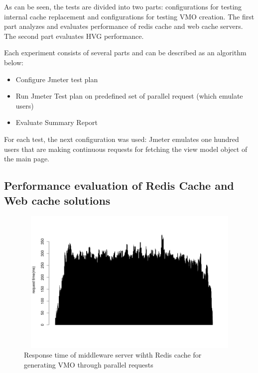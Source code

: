 As can be seen, the tests are divided into two parts: configurations for testing internal cache replacement and configurations for testing VMO creation. The first part analyzes and evaluates performance of redis cache and web cache servers. The second part  evaluates HVG performance.

Each experiment consists of several parts and can be described as an algorithm below: 

\begin{itemize}
  \item Configure Jmeter test plan
  \item Run Jmeter Test plan on predefined set of parallel request (which emulate users)
  \item Evaluate Summary Report
\end{itemize}

For each test, the next configuration was used: Jmeter emulates one hundred users that are making continuous requests for fetching the view model object of the main page.  


\subsection{Performance evaluation of Redis Cache and Web cache solutions}


\begin{figure}[h!]
    \centering
    \includegraphics[width=15cm,height=7cm,keepaspectratio]{images/vmo_redis_mult_par.png}
    \caption{Response time of middleware server wihth Redis cache for generating VMO through parallel requests}
    \label{fig:vmo_redis_mult_par}
\end{figure}



